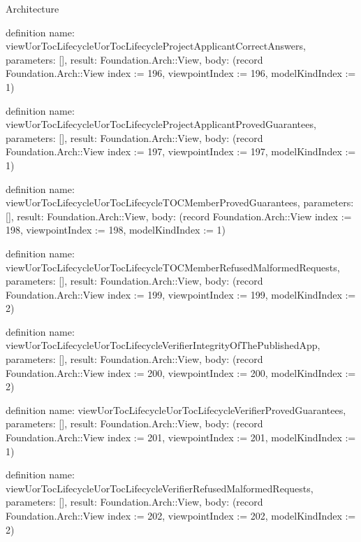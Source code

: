 \begin{lexlean}{Architecture}
\begin{semanticmodule}
definition{
  name: viewUorTocLifecycleUorTocLifecycleProjectApplicantCorrectAnswers,
  parameters: [],
  result: Foundation.Arch::View,
  body: (record Foundation.Arch::View {index := 196, viewpointIndex := 196, modelKindIndex := 1})
}

definition{
  name: viewUorTocLifecycleUorTocLifecycleProjectApplicantProvedGuarantees,
  parameters: [],
  result: Foundation.Arch::View,
  body: (record Foundation.Arch::View {index := 197, viewpointIndex := 197, modelKindIndex := 1})
}

definition{
  name: viewUorTocLifecycleUorTocLifecycleTOCMemberProvedGuarantees,
  parameters: [],
  result: Foundation.Arch::View,
  body: (record Foundation.Arch::View {index := 198, viewpointIndex := 198, modelKindIndex := 1})
}

definition{
  name: viewUorTocLifecycleUorTocLifecycleTOCMemberRefusedMalformedRequests,
  parameters: [],
  result: Foundation.Arch::View,
  body: (record Foundation.Arch::View {index := 199, viewpointIndex := 199, modelKindIndex := 2})
}

definition{
  name: viewUorTocLifecycleUorTocLifecycleVerifierIntegrityOfThePublishedApp,
  parameters: [],
  result: Foundation.Arch::View,
  body: (record Foundation.Arch::View {index := 200, viewpointIndex := 200, modelKindIndex := 2})
}

definition{
  name: viewUorTocLifecycleUorTocLifecycleVerifierProvedGuarantees,
  parameters: [],
  result: Foundation.Arch::View,
  body: (record Foundation.Arch::View {index := 201, viewpointIndex := 201, modelKindIndex := 1})
}

definition{
  name: viewUorTocLifecycleUorTocLifecycleVerifierRefusedMalformedRequests,
  parameters: [],
  result: Foundation.Arch::View,
  body: (record Foundation.Arch::View {index := 202, viewpointIndex := 202, modelKindIndex := 2})
}


\end{semanticmodule}
\end{lexlean}
